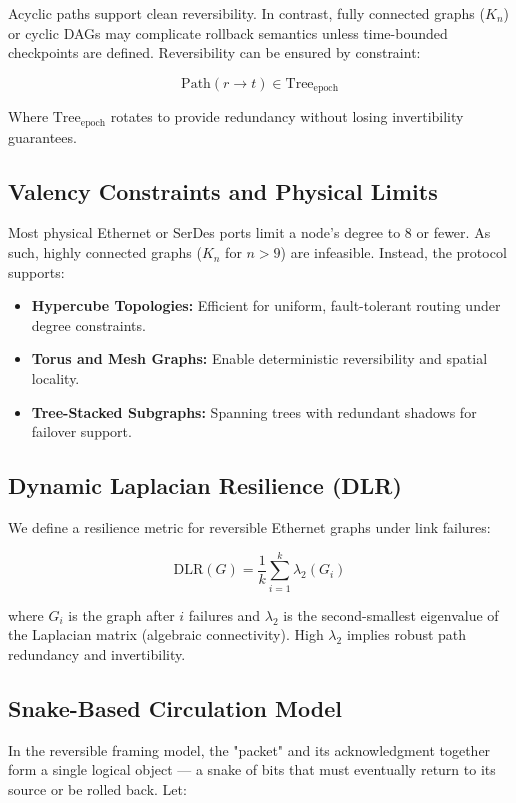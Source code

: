 Acyclic paths support clean reversibility. In contrast, fully connected graphs ($K_n$) or cyclic DAGs may complicate rollback semantics unless time-bounded checkpoints are defined. Reversibility can be ensured by constraint:

\[
\text{Path}(r \rightarrow t) \in \text{Tree}_{\text{epoch}}
\]

Where $\text{Tree}_{\text{epoch}}$ rotates to provide redundancy without losing invertibility guarantees.

\subsection*{Valency Constraints and Physical Limits}

Most physical Ethernet or SerDes ports limit a node’s degree to 8 or fewer. As such, highly connected graphs ($K_n$ for $n > 9$) are infeasible. Instead, the protocol supports:

\begin{itemize}
  \item \textbf{Hypercube Topologies:} Efficient for uniform, fault-tolerant routing under degree constraints.
  \item \textbf{Torus and Mesh Graphs:} Enable deterministic reversibility and spatial locality.
  \item \textbf{Tree-Stacked Subgraphs:} Spanning trees with redundant shadows for failover support.
\end{itemize}

\subsection*{Dynamic Laplacian Resilience (DLR)}

We define a resilience metric for reversible Ethernet graphs under link failures:

\[
\text{DLR}(G) = \frac{1}{k} \sum_{i=1}^k \lambda_2(G_i)
\]

where $G_i$ is the graph after $i$ failures and $\lambda_2$ is the second-smallest eigenvalue of the Laplacian matrix (algebraic connectivity). High $\lambda_2$ implies robust path redundancy and invertibility.

\subsection*{Snake-Based Circulation Model}

In the reversible framing model, the "packet" and its acknowledgment together form a single logical object — a snake of bits that must eventually return to its source or be rolled back. Let:

